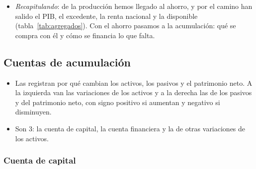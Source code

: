 \documentclass[11pt]{article}
\begin{document}
\begin{itemize}
\item \emph{Recapitulando}: de la producción hemos llegado al ahorro, y por el camino han salido el PIB, el excedente, la renta nacional y la disponible (tabla~\ref{tab:agregados}). Con el ahorro pasamos a la acumulación: qué se compra con él y cómo se financia lo que falta.
\end{itemize}

\subsection{Cuentas de acumulación}\label{sec:acumulacion}

\begin{itemize}
\item Las  registran por qué cambian los activos, los pasivos y el patrimonio neto. A la izquierda van las variaciones de los activos y a la derecha las de los pasivos y del patrimonio neto, con signo positivo si aumentan y negativo si disminuyen.
\item Son 3: la cuenta de capital, la cuenta financiera y la de otras variaciones de los activos.
\end{itemize}

\subsubsection{Cuenta de capital}\label{sec:cuenta-capital}
\end{document}
